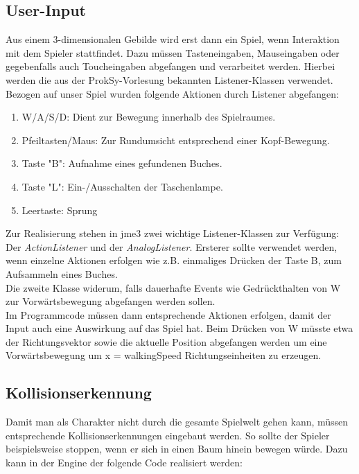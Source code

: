 \subsection{User-Input}

Aus einem 3-dimensionalen Gebilde wird erst dann ein Spiel, wenn Interaktion mit dem Spieler stattfindet. Dazu müssen Tasteneingaben, Mauseingaben oder gegebenfalls auch Toucheingaben abgefangen und verarbeitet werden.
Hierbei werden die aus der ProkSy-Vorlesung bekannten Listener-Klassen verwendet.
Bezogen auf unser Spiel wurden folgende Aktionen durch Listener abgefangen:
\begin{enumerate}
	\item W/A/S/D: Dient zur Bewegung innerhalb des Spielraumes.
	\item Pfeiltasten/Maus: Zur Rundumsicht entsprechend einer Kopf-Bewegung.
	\item Taste "B": Aufnahme eines gefundenen Buches.
	\item Taste "L": Ein-/Ausschalten der Taschenlampe.
	\item Leertaste: Sprung
\end{enumerate} Zur Realisierung stehen in jme3 zwei wichtige Listener-Klassen zur Verfügung: Der \emph{ActionListener} und der \emph{AnalogListener}.
Ersterer sollte verwendet werden, wenn einzelne Aktionen erfolgen wie z.B. einmaliges Drücken der Taste B, zum Aufsammeln eines Buches.\\
Die zweite Klasse widerum, falls dauerhafte Events wie Gedrückthalten von W zur Vorwärtsbewegung abgefangen werden sollen. \\
Im Programmcode müssen dann entsprechende Aktionen erfolgen, damit der Input auch eine Auswirkung auf das Spiel hat. Beim Drücken von W müsste etwa der Richtungsvektor sowie die aktuelle Position abgefangen werden um eine Vorwärtsbewegung um x = walkingSpeed Richtungseinheiten zu erzeugen.

\subsection{Kollisionserkennung}
Damit man als Charakter nicht durch die gesamte Spielwelt gehen kann, müssen entsprechende Kollisionserkennungen eingebaut werden. So sollte der Spieler beispielsweise stoppen, wenn er sich in einen Baum hinein bewegen würde. Dazu kann in der Engine der folgende Code realisiert werden:


